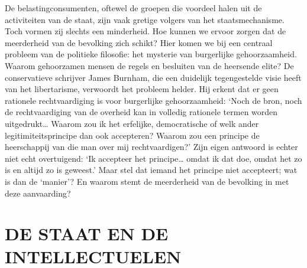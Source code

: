\documentclass[
  a5paper,
  smalldemyvopaper,10pt,twoside,onecolumn,openright,extrafontsizes,hidelinks]{memoir}
\begin{document}
De belastingconsumenten, oftewel de groepen die voordeel halen uit de
activiteiten van de staat, zijn vaak gretige volgers van het
staatsmechanisme. Toch vormen zij slechts een minderheid. Hoe kunnen we
ervoor zorgen dat de meerderheid van de bevolking zich schikt? Hier
komen we bij een centraal probleem van de politieke filosofie: het
mysterie van burgerlijke gehoorzaamheid. Waarom gehoorzamen mensen de
regels en besluiten van de heersende elite? De conservatieve schrijver
James Burnham, die een duidelijk tegengestelde visie heeft van het
libertarisme, verwoordt het probleem helder. Hij erkent dat er geen
rationele rechtvaardiging is voor burgerlijke gehoorzaamheid: `Noch de
bron, noch de rechtvaardiging van de overheid kan in volledig rationele
termen worden uitgedrukt\ldots{} Waarom zou ik het erfelijke,
democratische of welk ander legitimiteitsprincipe dan ook accepteren?
Waarom zou een principe de heerschappij van die man over mij
rechtvaardigen?' Zijn eigen antwoord is echter niet echt overtuigend:
`Ik accepteer het principe\ldots{} omdat ik dat doe, omdat het zo is en
altijd zo is geweest.' Maar stel dat iemand het principe niet
accepteert; wat is dan de `manier'? En waarom stemt de meerderheid van
de bevolking in met deze aanvaarding?

\section{DE STAAT EN DE
INTELLECTUELEN}\label{de-staat-en-de-intellectuelen}
\end{document}
